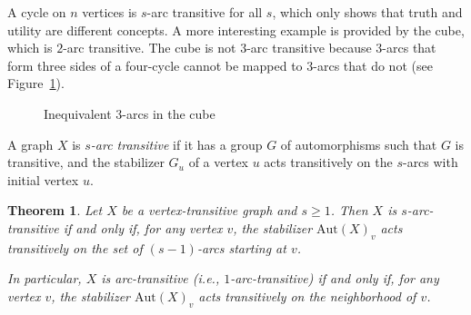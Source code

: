 \documentclass[12pt,a4paper,openany]{book}
\newtheorem{theorem}{Theorem}[section]
\begin{document}
A cycle on $n$ vertices is $s$-arc transitive for all $s$, which only shows that truth and utility are different concepts. A more interesting example is provided by the cube, which is $2$-arc transitive. The cube is not $3$-arc transitive because $3$-arcs that form three sides of a four-cycle cannot be mapped to $3$-arcs that do not (see Figure~\ref{fig:cube-arcs}).

\begin{figure}[h]
\centering
{}
\caption{Inequivalent 3-arcs in the cube}
\label{fig:cube-arcs}
\end{figure}

A graph $X$ is \emph{$s$-arc transitive} if it has a group $G$ of automorphisms such that $G$ is transitive, and the stabilizer $G_u$ of a vertex $u$ acts transitively on the $s$-arcs with initial vertex $u$.



\begin{theorem}
Let $X$ be a vertex-transitive graph and $s\ge 1$. Then $X$ is
$s$-arc-transitive if and only if, for any vertex $v$, the stabilizer
$\mathrm{Aut}(X)_v$ acts transitively on the set of $(s-1)$-arcs starting at $v$.

In particular, $X$ is arc-transitive (i.e., $1$-arc-transitive) if and
only if, for any vertex $v$, the stabilizer $\mathrm{Aut}(X)_v$ acts
transitively on the neighborhood of $v$.
\end{theorem}
\end{document}
